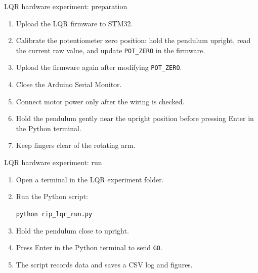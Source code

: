 \documentclass[aspectratio=169]{beamer}
\begin{document}
\begin{frame}{LQR hardware experiment: preparation}

\begin{enumerate}
    \item Upload the LQR firmware to STM32.
    \vspace{0.18cm}

    \item Calibrate the potentiometer zero position:
    hold the pendulum upright, read the current raw value, and update \texttt{POT\_ZERO} in the firmware.
    \vspace{0.18cm}

    \item Upload the firmware again after modifying \texttt{POT\_ZERO}.
    \vspace{0.18cm}

    \item Close the Arduino Serial Monitor.
    \vspace{0.18cm}

    \item Connect motor power only after the wiring is checked.
    \vspace{0.18cm}

    \item Hold the pendulum gently near the upright position before pressing Enter in the Python terminal.
    \vspace{0.18cm}

    \item Keep fingers clear of the rotating arm.
\end{enumerate}

\vspace{0.15cm}


\end{frame}

\begin{frame}{LQR hardware experiment: run}
\begin{enumerate}
    \item Open a terminal in the LQR experiment folder.
    \vspace{0.25cm}
    \item Run the Python script:
    \vspace{0.1cm}
    \begin{center}
    \texttt{python rip\_lqr\_run.py}
    \end{center}
    \vspace{0.2cm}
    \item Hold the pendulum close to upright.
    \vspace{0.25cm}
    \item Press Enter in the Python terminal to send \texttt{GO}.
    \vspace{0.25cm}
    \item The script records data and saves a CSV log and figures.
\end{enumerate}
\end{frame}
\end{document}

